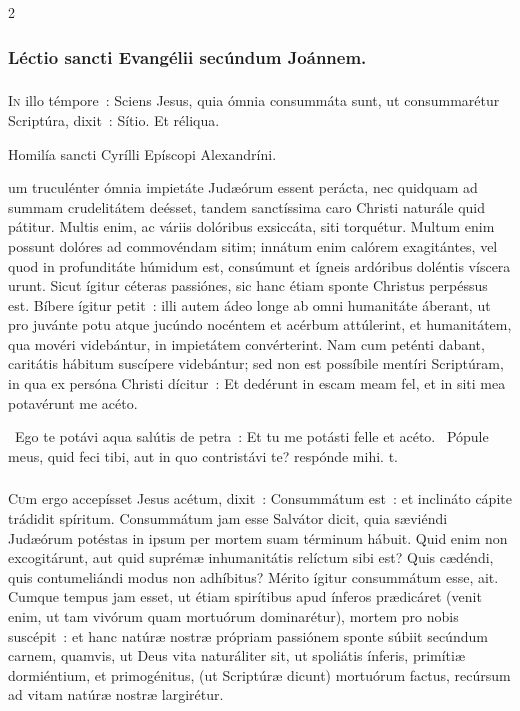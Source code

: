 \documentclass[9pt,twoside]{extarticle}
\begin{document}
\begin{multicols}{2}
{{{\subsubsection*{\center Léctio sancti Evangélii secúndum Joánnem.}
\subsubsection*{\center {}}
\lettrine{I}n illo témpore~: Sciens Jesus, quia ómnia consummáta sunt, ut consummarétur Scriptúra, dixit~: Sítio. Et réliqua.

\begin{center}Homilía sancti Cyrílli Epíscopi Alexandríni.\\
\end{center}
um truculénter ómnia impietáte Judæórum essent perácta, nec quidquam ad summam crudelitátem deésset, tandem sanctíssima caro Christi naturále quid pátitur. Multis enim, ac váriis dolóribus exsiccáta, siti torquétur. Multum enim possunt dolóres ad commovéndam sitim; innátum enim calórem exagitántes, vel quod in profunditáte húmidum est, consúmunt et ígneis ardóribus doléntis víscera urunt. Sicut ígitur céteras passiónes, sic hanc étiam sponte Christus perpéssus est. Bíbere ígitur petit~: illi autem ádeo longe ab omni humanitáte áberant, ut pro juvánte potu atque jucúndo nocéntem et acérbum attúlerint, et humanitátem, qua movéri videbántur, in impietátem convérterint. Nam cum peténti dabant, caritátis hábitum suscípere videbántur; sed non est possíbile mentíri Scriptúram, in qua ex persóna Christi dícitur~: Et dedérunt in escam meam fel, et in siti mea potavérunt me acéto.

\begin{tightlist}{}
\item {}~Ego te potávi aqua salútis de petra~: \textred{*} Et tu me potásti felle et acéto. ~Pópule meus, quid feci tibi, aut in quo contristávi te? respónde mihi. t.
\end{tightlist}

\subsubsection*{\center{}}
\lettrine{C}um ergo accepísset Jesus acétum, dixit~: Consummátum est~: et inclináto cápite trádidit spíritum. Consummátum jam esse Salvátor dicit, quia sæviéndi Judæórum potéstas in ipsum per mortem suam términum hábuit. Quid enim non excogitárunt, aut quid suprémæ inhumanitátis relíctum sibi est? Quis cædéndi, quis contumeliándi modus non adhíbitus? Mérito ígitur consummátum esse, ait. Cumque tempus jam esset, ut étiam spirítibus apud ínferos prædicáret (venit enim, ut tam vivórum quam mortuórum dominarétur), mortem pro nobis suscépit~: et hanc natúræ nostræ própriam passiónem sponte súbiit secúndum carnem, quamvis, ut Deus vita naturáliter sit, ut spoliátis ínferis, primítiæ dormiéntium, et primogénitus, (ut Scriptúræ dicunt) mortuórum factus, recúrsum ad vitam natúræ nostræ largirétur.

}}}
\end{multicols}
\end{document}
